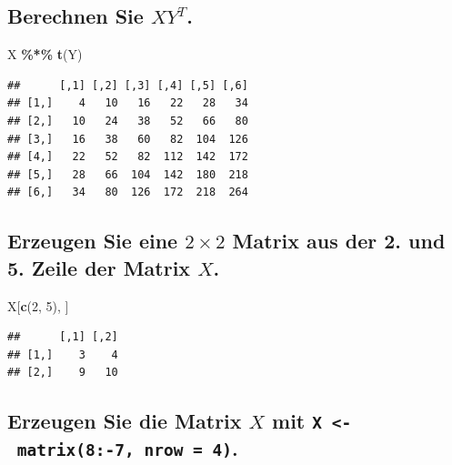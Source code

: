 \documentclass[12pt,a4paper]{article}
\newenvironment{Shaded}{\begin{snugshade}}{\end{snugshade}}
\newcommand{\DecValTok}[1]{\textcolor[rgb]{0.00,0.00,0.81}{#1}}
\newcommand{\FunctionTok}[1]{\textcolor[rgb]{0.13,0.29,0.53}{\textbf{#1}}}
\newcommand{\NormalTok}[1]{#1}
\newcommand{\SpecialCharTok}[1]{\textcolor[rgb]{0.81,0.36,0.00}{\textbf{#1}}}
\begin{document}
\vspace{0.5cm}

\subsection{\texorpdfstring{Berechnen Sie
\(XY^{T}\).}{Berechnen Sie XY\^{}\{T\}.}}\label{berechnen-sie-xyt.}

\begin{Shaded}
\begin{Highlighting}[]
\NormalTok{    X }\SpecialCharTok{\%*\%} \FunctionTok{t}\NormalTok{(Y)}
\end{Highlighting}
\end{Shaded}

\begin{verbatim}
##      [,1] [,2] [,3] [,4] [,5] [,6]
## [1,]    4   10   16   22   28   34
## [2,]   10   24   38   52   66   80
## [3,]   16   38   60   82  104  126
## [4,]   22   52   82  112  142  172
## [5,]   28   66  104  142  180  218
## [6,]   34   80  126  172  218  264
\end{verbatim}

\vspace{0.5cm}

\subsection{\texorpdfstring{Erzeugen Sie eine \(2 \times 2\) Matrix aus
der 2. und 5. Zeile der Matrix
\(X\).}{Erzeugen Sie eine 2 \textbackslash times 2 Matrix aus der 2. und 5. Zeile der Matrix X.}}\label{erzeugen-sie-eine-2-times-2-matrix-aus-der-2.-und-5.-zeile-der-matrix-x.}

\begin{Shaded}
\begin{Highlighting}[]
\NormalTok{    X[}\FunctionTok{c}\NormalTok{(}\DecValTok{2}\NormalTok{, }\DecValTok{5}\NormalTok{), ]}
\end{Highlighting}
\end{Shaded}

\begin{verbatim}
##      [,1] [,2]
## [1,]    3    4
## [2,]    9   10
\end{verbatim}

\vspace{0.5cm}

\subsection{\texorpdfstring{Erzeugen Sie die Matrix \(X\) mit
\texttt{X\ \textless{}-\ matrix(8:-7,\ nrow\ =\ 4)}.}{Erzeugen Sie die Matrix X mit X \textless- matrix(8:-7, nrow = 4).}}\label{erzeugen-sie-die-matrix-x-mit-x---matrix8-7-nrow-4.}
\end{document}
